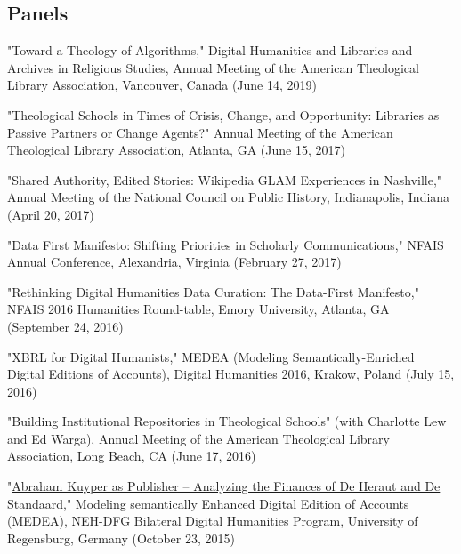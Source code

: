 \documentclass[10pt]{res} %
\begin{document}
\begin{resume}
\section{Panels}

\begin{hangparas}{.25in}{1}"Toward a Theology of Algorithms," Digital Humanities and Libraries and Archives in Religious Studies, Annual Meeting of the American Theological Library Association, Vancouver, Canada (June 14, 2019)\end{hangparas}

\begin{hangparas}{.25in}{1}"Theological Schools in Times of Crisis, Change, and Opportunity: Libraries as Passive Partners or Change Agents?" Annual Meeting of the American Theological Library Association, Atlanta, GA (June 15, 2017)\end{hangparas}

\begin{hangparas}{.25in}{1}"Shared Authority, Edited Stories: Wikipedia GLAM Experiences in Nashville," Annual Meeting of the National Council on Public History, Indianapolis, Indiana (April 20, 2017)\end{hangparas}

\begin{hangparas}{.25in}{1}"Data First Manifesto: Shifting Priorities in Scholarly Communications," NFAIS Annual Conference, Alexandria, Virginia (February 27, 2017)\end{hangparas}

\begin{hangparas}{.25in}{1}"Rethinking Digital Humanities Data Curation: The Data-First Manifesto," NFAIS 2016 Humanities Round-table, Emory University, Atlanta, GA (September 24, 2016)\end{hangparas}

\begin{hangparas}{.25in}{1}"XBRL for Digital Humanists," MEDEA (Modeling Semantically-Enriched Digital Editions of Accounts), Digital Humanities 2016, Krakow, Poland (July 15, 2016)\end{hangparas}

\begin{hangparas}{.25in}{1}"Building Institutional Repositories in Theological Schools" (with Charlotte Lew and Ed Warga), Annual Meeting of the American Theological Library Association, Long Beach, CA (June 17, 2016)\end{hangparas}

\begin{hangparas}{.25in}{1}"\href{http://medea.hypotheses.org/200}{Abraham Kuyper as Publisher – Analyzing the Finances of De Heraut and De Standaard}," Modeling semantically Enhanced Digital Edition of Accounts (MEDEA), NEH-DFG Bilateral Digital Humanities Program, University of Regensburg, Germany (October 23, 2015)\end{hangparas}


\end{resume}
\end{document}
